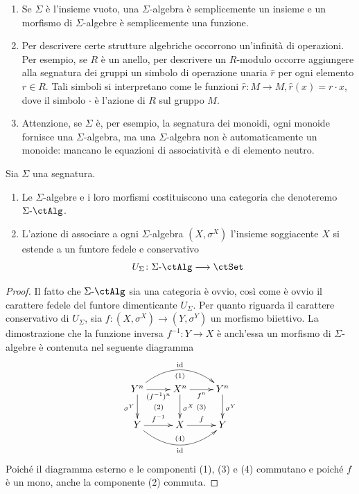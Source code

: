 \begin{examples}\label{esempi_sigma_alg}
 \hfill
 \begin{enumerate}
  \item Se \(\Sigma\) è l'insieme vuoto, una \(\Sigma\)-algebra è semplicemente un insieme e un morfismo di \(\Sigma\)-algebre è
        semplicemente una funzione.
  \item Per descrivere certe strutture algebriche occorrono un'infinità di operazioni. Per esempio, se \(R\) è un anello, per descrivere un
        \(R\)-modulo occorre aggiungere alla segnatura dei gruppi un simbolo di operazione unaria \(\widehat{r}\) per ogni elemento \(r \in R\).
        Tali simboli si interpretano come le funzioni \(\widehat{r} \colon M \to M, \widehat{r}(x) = r \cdot x\), dove il simbolo \(\cdot\) è l'azione di \(R\)
        sul gruppo \(M\).
  \item Attenzione, se \(\Sigma\) è, per esempio, la segnatura dei monoidi, ogni monoide fornisce una \(\Sigma\)-algebra, ma una \(\Sigma\)-algebra
        non è automaticamente un monoide: mancano le equazioni di associatività e di elemento neutro.
 \end{enumerate}
\end{examples}

\begin{proposition}\label{prop_cat_sigma_alg}
 Sia \(\Sigma\) una segnatura.
 \begin{enumerate}
  \item Le \(\Sigma\)-algebre e i loro morfismi costituiscono una categoria che denoteremo \(\ctSAlg\).
  \item L'azione di associare a ogni \(\Sigma\)-algebra \((X,\sigma^X)\) l'insieme soggiacente \(X\) si estende a un funtore fedele e
        conservativo
        \[U_{\Sigma} \colon \ctSAlg \fun \ctSet\]
 \end{enumerate}
\end{proposition}

\begin{proof}
 Il fatto che \(\ctSAlg\) sia una categoria è ovvio, così come è ovvio il carattere fedele del funtore dimenticante \(U_{\Sigma}\).
 Per quanto riguarda il carattere conservativo di \(U_{\Sigma}\), sia \(f \colon (X,\sigma^X) \to (Y,\sigma^Y)\) un morfismo biiettivo.
 La dimostrazione che la funzione inversa \(f^{-1} \colon Y \to X\) è anch'essa un morfismo di \(\Sigma\)-algebre è contenuta
 nel seguente diagramma
 \[\xymatrix{Y^n \ar[r]_-{(f^{-1})^n} \ar[d]_{\sigma^Y} \ar@/^1.7pc/[rr]^-{\id}_{(1)} & X^n \ar[d]^{\sigma^X} \ar[r]_-{f^n} & Y^n \ar[d]^{\sigma^Y} \\
  Y \ar[r]^-{f^{-1}} \ar@/_1.7pc/[rr]_-{\id}^{(4)} \ar@{}[ru]|{(2)} & X \ar[r]^-{f} \ar@{}[ru]|{(3)} & Y}\]
 Poiché il diagramma esterno e le componenti (1), (3) e (4) commutano e poiché \(f\) è un mono, anche la componente (2) commuta.
\end{proof}

